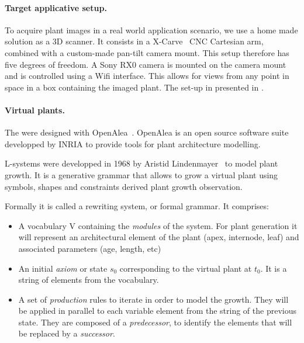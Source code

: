 \paragraph{Target applicative setup.}
To acquire plant images in a real world application scenario, we use a home made solution as a 3D
scanner. It consists in a X-Carve~\cite{xcarve} CNC Cartesian arm, combined with a
custom-made pan-tilt camera mount. This setup therefore has five degrees of freedom.
A Sony RX0 camera  is mounted on the camera mount and is controlled using a Wifi interface. This allows for views from any point in space in a box containing
the imaged plant. The set-up in presented in \cite{wintz_automated_nodate}.

\paragraph{Virtual plants.}

The  were designed with
OpenAlea~\cite{pradal2009plantgl}. OpenAlea is an open source software
suite developped by INRIA to provide tools for plant architecture
modelling. 

 L-systems were developped
in 1968 by Aristid Lindenmayer~\cite{prusinkiewicz2012algorithmic}
to model plant growth.  It is a generative grammar that allows to
grow a virtual plant using symbols, shapes and constraints derived
 plant growth observation.

Formally it is called a rewriting system, or formal grammar. It
comprises:

\begin{itemize}
    \item A vocabulary V containing the \emph{modules} of the
    system. For plant generation it will represent an architectural
    element of the plant (apex, internode, leaf) and associated
    parameters (age, length, etc) \item An initial \emph{axiom}
    or state $s_0$ corresponding to the virtual plant at $t_0$. It
    is a string of elements from the vocabulary.  \item A set
    of \emph{production} rules to iterate in order to model
    the growth. They will be applied in parallel to each variable
    element from the string of the previous state. They are composed
    of a \emph{predecessor}, to identify the elements that will be
    replaced by a \emph{successor}.
\end{itemize}

